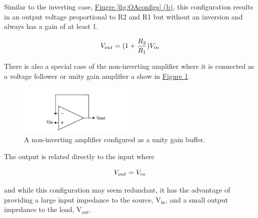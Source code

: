 Similar to the inverting case, \hyperref[fig:OAconfigs]{Fiugre \ref*{fig:OAconfigs} (b)}, this configuration results in an output voltage proportional to R2 and R1 but without an inversion and always has a gain of at least 1.

\begin{equation}
	\centering
	V_{out} =(1+\frac{R_2}{R_1})V_{in}
\end{equation}

There is also a special case of the non-inverting amplifier where it is connected as a voltage follower or unity gain amplifier a show in \hyperref[fig:OAbuffer]{Figure \ref*{fig:OAbuffer}}.

\begin{figure} [h]
	\centering
		\includegraphics[width=0.5\textwidth]{Lab4buffer.pdf}
	\caption{A non-inverting amplifier configured as a unity gain buffer.} \label{fig:OAbuffer}
\end{figure}

The output is related directly to the input where

\begin{equation}
	\centering
	V_{out} = V_{in}
\end{equation}

\noindent and while this configuration may seem redundant, it has the advantage of providing a large input impedance to the source, $\mathrm{V_{in}}$, and a small output impedance to the load, $\mathrm{V_{out}}$. 

